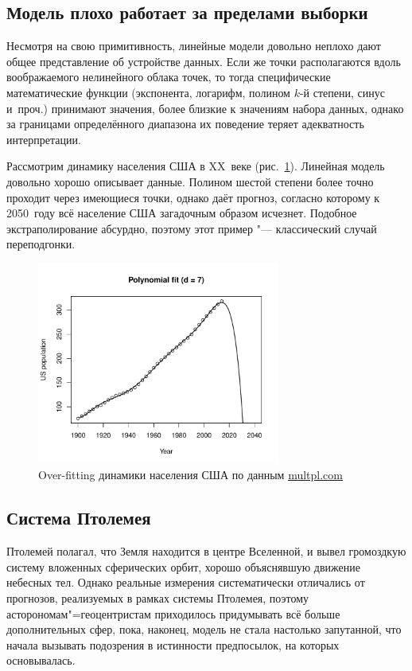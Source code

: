 \documentclass[final,pdftex]{../../template/epsilonj}
\begin{document}
\subsection{Модель плохо работает за пределами выборки}

Несмотря на свою примитивность, линейные модели довольно неплохо дают общее представление об устройстве данных. Если же точки располагаются вдоль воображаемого нелинейного облака точек, то тогда специфические математические функции (экспонента, логарифм, полином $k$-й степени, синус и~проч.) принимают значения, более близкие к значениям набора данных, однако за границами определённого диапазона их поведение теряет адекватность интерпретации.

Рассмотрим динамику населения США в XX~веке (рис.~\ref{fig:usa}). Линейная модель довольно хорошо описывает данные. Полином шестой степени более точно проходит через имеющиеся точки, однако даёт прогноз, согласно которому к 2050~году всё население США загадочным образом исчезнет. Подобное экстраполирование абсурдно, поэтому этот пример "--- классический случай переподгонки.

\begin{figure}[htbp]
	\centering
	\includegraphics[width=8cm]{overfit.pdf}
	\caption{Over-fitting динамики населения США по данным \href{http://www.multpl.com/united-states-population/table}{multpl.com}} \label{fig:usa}
\end{figure}

\subsection{Система Птолемея}

Птолемей полагал, что Земля находится в центре Вселенной, и вывел громоздкую систему вложенных сферических орбит, хорошо объяснявшую движение небесных тел. Однако реальные измерения систематически отличались от прогнозов, реализуемых в рамках системы Птолемея, поэтому асторономам"=геоцентристам приходилось придумывать всё больше дополнительных сфер, пока, наконец, модель не стала настолько запутанной, что начала вызывать подозрения в истинности предпосылок, на которых основывалась.
\end{document}
